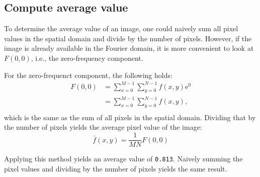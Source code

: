 \subsection{Compute average value}
To determine the average value of an image, one could naively sum all pixel values in the spatial domain and divide by the number of pixels.
However, if the image is already available in the Fourier domain, it is more convenient to look at \(F(0, 0)\), i.e., the zero-frequency component.

For the zero-frequenct component, the following holds:
\begin{equation} \label{zero_freq}
\begin{split}
F(0, 0) & = \sum_{x=0}^{M-1}\sum_{y=0}^{N-1}{f(x, y)\mathrm{e}^{0}} \\
 & = \sum_{x=0}^{M-1}\sum_{y=0}^{N-1}{f(x, y)}\text{,} \\
\end{split}
\end{equation}
which is the same as the sum of all pixels in the spatial domain.
Dividing that by the number of pixels yields the average pixel value of the image:
\[\bar{f}(x, y) = \frac{1}{MN}F(0, 0)\]

Applying this method yields an average value of \texttt{0.813}.
Naively summing the pixel values and dividing by the number of pixels yields the same result.

\clearpage
